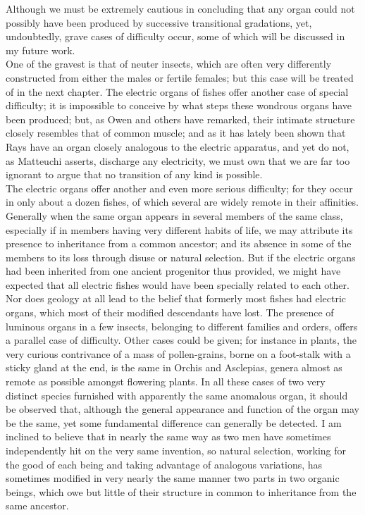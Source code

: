 \indent Although we must be extremely cautious in concluding that any organ could not possibly have been produced by successive transitional gradations, yet, undoubtedly, grave cases of difficulty occur, some of which will be discussed in my future work.\\
\indent One of the gravest is that of neuter insects, which are often very differently constructed from either the males or fertile females; but this case will be treated of in the next chapter. The electric organs of fishes offer another case of special difficulty; it is impossible to conceive by what steps these wondrous organs have been produced; but, as Owen and others have remarked, their intimate structure closely resembles that of common muscle; and as it has lately been shown that Rays have an organ closely analogous to the electric apparatus, and yet do not, as Matteuchi asserts, discharge any electricity, we must own that we are far too ignorant to argue that no transition of any kind is possible.\\
\indent The electric organs offer another and even more serious difficulty; for they occur in only about a dozen fishes, of which several are widely remote in their affinities. Generally when the same organ appears in several members of the same class, especially if in members having very different habits of life, we may attribute its presence to inheritance from a common ancestor; and its absence in some of the members to its loss through disuse or natural selection. But if the electric organs had been inherited from one ancient progenitor thus provided, we might have expected that all electric fishes would have been specially related to each other. Nor does geology at all lead to the belief that formerly most fishes had electric organs, which most of their modified descendants have lost. The presence of luminous organs in a few insects, belonging to different families and orders, offers a parallel case of difficulty. Other cases could be given; for instance in plants, the very curious contrivance of a mass of pollen-grains, borne on a foot-stalk with a sticky gland at the end, is the same in Orchis and Asclepias, genera almost as remote as possible amongst flowering plants. In all these cases of two very distinct species furnished with apparently the same anomalous organ, it should be observed that, although the general appearance and function of the organ may be the same, yet some fundamental difference can generally be detected. I am inclined to believe that in nearly the same way as two men have sometimes independently hit on the very same invention, so natural selection, working for the good of each being and taking advantage of analogous variations, has sometimes modified in very nearly the same manner two parts in two organic beings, which owe but little of their structure in common to inheritance from the same ancestor.\\
